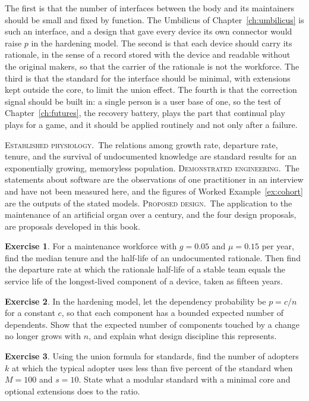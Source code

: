 \documentclass[11pt,openany]{book}
\theoremstyle{definition}
\newtheorem{exercise}{Exercise}[chapter]
\theoremstyle{remark}
\newcommand{\est}{\textsc{Established physiology.}\ }
\newcommand{\dem}{\textsc{Demonstrated engineering.}\ }
\newcommand{\pro}{\textsc{Proposed design.}\ }
\begin{document}
The first is that the number of interfaces between the body and its maintainers should be small and fixed by function. The Umbilicus of Chapter~\ref{ch:umbilicus} is such an interface, and a design that gave every device its own connector would raise $p$ in the hardening model. The second is that each device should carry its rationale, in the sense of a record stored with the device and readable without the original makers, so that the carrier of the rationale is not the workforce. The third is that the standard for the interface should be minimal, with extensions kept outside the core, to limit the union effect. The fourth is that the correction signal should be built in: a single person is a user base of one, so the test of Chapter~\ref{ch:futures}, the recovery battery, plays the part that continual play plays for a game, and it should be applied routinely and not only after a failure.

\begin{evidence}
\est The relations among growth rate, departure rate, tenure, and the survival of undocumented knowledge are standard results for an exponentially growing, memoryless population. \dem The statements about software are the observations of one practitioner in an interview and have not been measured here, and the figures of Worked Example~\ref{ex:cohort} are the outputs of the stated models. \pro The application to the maintenance of an artificial organ over a century, and the four design proposals, are proposals developed in this book.
\end{evidence}

\begin{exercise}
For a maintenance workforce with $g=0.05$ and $\mu=0.15$ per year, find the median tenure and the half-life of an undocumented rationale. Then find the departure rate at which the rationale half-life of a stable team equals the service life of the longest-lived component of a device, taken as fifteen years.
\end{exercise}

\begin{exercise}
In the hardening model, let the dependency probability be $p=c/n$ for a constant $c$, so that each component has a bounded expected number of dependents. Show that the expected number of components touched by a change no longer grows with $n$, and explain what design discipline this represents.
\end{exercise}

\begin{exercise}
Using the union formula for standards, find the number of adopters $k$ at which the typical adopter uses less than five percent of the standard when $M=100$ and $s=10$. State what a modular standard with a minimal core and optional extensions does to the ratio.
\end{exercise}
\end{document}
